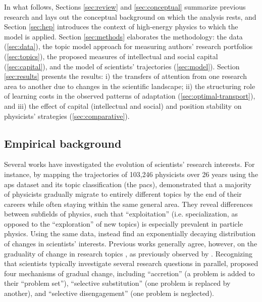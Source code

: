 \documentclass{article}
\begin{document}
In what follows, Sections \ref{sec:review} and \ref{sec:conceptual} summarize previous research and lays out the conceptual background on which the analysis rests, and Section \ref{sec:hep} introduces the context of high-energy physics to which the model is applied. 
Section \ref{sec:methods} elaborates the methodology: the data (\ref{sec:data}), the topic model approach for measuring authors' research portfolios (\ref{sec:topics}), the proposed measures of intellectual and social capital (\ref{sec:capital}), and the model of scientists' trajectories (\ref{sec:model}).
Section \ref{sec:results} presents the results: i) the transfers of attention from one research area to another due to changes in the scientific landscape; ii) the structuring role of learning costs in the observed patterns of adaptation (\ref{sec:optimal-transport}), and iii) the effect of capital (intellectual and social) and position stability on physicists' strategies (\ref{sec:comparative}). %


\subsection{\label{sec:review}Empirical background}

Several works have investigated the evolution of scientists' research interests. For instance, by mapping the trajectories of 103,246 physicists over 26 years using the \gls{aps} dataset and its topic classification (the \gls{pacs}), \citet{Aleta2019} demonstrated that a majority of physicists gradually migrate to entirely different topics by the end of their careers while often staying within the same general area. They reveal differences between subfields of physics, such that ``exploitation'' (i.e. specialization, as opposed to the ``exploration'' of new topics) is especially prevalent in particle physics.  Using the same data, \citet{Jia2017} instead find an exponentially decaying distribution of changes in scientists' interests. %
Previous works generally agree, however, on the graduality of change in research topics \citep{Jia2017,Aleta2019,Zeng2019}, as previously observed by  \citet{Gieryn1978}. Recognizing that scientists typically investigate several research questions in parallel, \citeauthor{Gieryn1978} proposed four mechanisms of gradual change, including ``accretion'' (a problem is added to their ``problem set''),  ``selective substitution'' (one problem is replaced by another), and ``selective disengagement'' (one problem is neglected).
\end{document}
